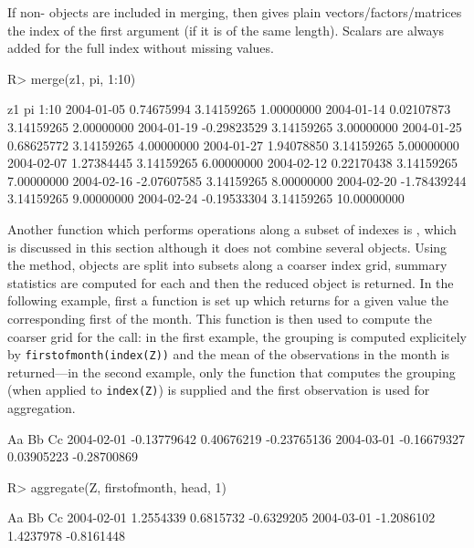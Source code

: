 \documentclass{Z}
\begin{document}
If non- objects are included in merging,
then  gives plain vectors/factors/matrices the index of the
first argument (if it is of the same length). Scalars are always added for
the full index without missing values.

\begin{Schunk}
\begin{Sinput}
R> merge(z1, pi, 1:10)
\end{Sinput}
\begin{Soutput}
           z1          pi          1:10       
2004-01-05  0.74675994  3.14159265  1.00000000
2004-01-14  0.02107873  3.14159265  2.00000000
2004-01-19 -0.29823529  3.14159265  3.00000000
2004-01-25  0.68625772  3.14159265  4.00000000
2004-01-27  1.94078850  3.14159265  5.00000000
2004-02-07  1.27384445  3.14159265  6.00000000
2004-02-12  0.22170438  3.14159265  7.00000000
2004-02-16 -2.07607585  3.14159265  8.00000000
2004-02-20 -1.78439244  3.14159265  9.00000000
2004-02-24 -0.19533304  3.14159265 10.00000000
\end{Soutput}
\end{Schunk}

Another function which performs operations along a subset of indexes
is , which is discussed in this section although
it does not combine several objects. Using the  method,  objects
are split into subsets along a coarser index grid,
summary statistics are computed for each and then the 
reduced object is returned. In the following example,
first a function is set up which returns for a given 
value the corresponding first of the month. This function is then
used to compute the coarser grid for the  call: in
the first example, the grouping is computed explicitely by \verb/firstofmonth(index(Z))/
and the mean of the observations in the month
is returned---in the second example, only the function that computes 
the grouping (when applied to \verb/index(Z)/) is supplied and
the first observation is used for aggregation.

\begin{Schunk}
\begin{Soutput}
           Aa          Bb          Cc         
2004-02-01 -0.13779642  0.40676219 -0.23765136
2004-03-01 -0.16679327  0.03905223 -0.28700869
\end{Soutput}
\begin{Sinput}
R> aggregate(Z, firstofmonth, head, 1)
\end{Sinput}
\begin{Soutput}
           Aa         Bb         Cc        
2004-02-01  1.2554339  0.6815732 -0.6329205
2004-03-01 -1.2086102  1.4237978 -0.8161448
\end{Soutput}
\end{Schunk}
\end{document}
